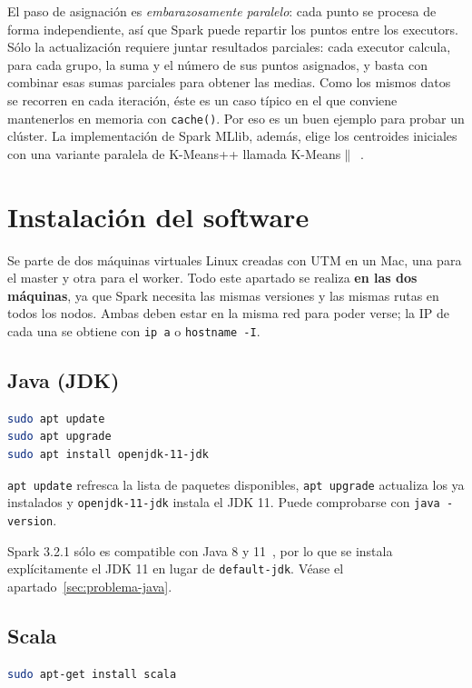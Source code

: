 \documentclass[11pt,a4paper]{article}
\begin{document}
El paso de asignación es \emph{embarazosamente paralelo}: cada punto se procesa de forma independiente, así que Spark puede repartir los puntos entre los executors. Sólo la actualización requiere juntar resultados parciales: cada executor calcula, para cada grupo, la suma y el número de sus puntos asignados, y basta con combinar esas sumas parciales para obtener las medias. Como los mismos datos se recorren en cada iteración, éste es un caso típico en el que conviene mantenerlos en memoria con \texttt{cache()}. Por eso es un buen ejemplo para probar un clúster. La implementación de Spark MLlib, además, elige los centroides iniciales con una variante paralela de K-Means++ llamada K-Means$\|$~\cite{spark-mllib-clustering}.

\section{Instalación del software}

Se parte de dos máquinas virtuales Linux creadas con UTM en un Mac, una para el master y otra para el worker. Todo este apartado se realiza \textbf{en las dos máquinas}, ya que Spark necesita las mismas versiones y las mismas rutas en todos los nodos. Ambas deben estar en la misma red para poder verse; la IP de cada una se obtiene con \texttt{ip a} o \texttt{hostname -I}.

\subsection{Java (JDK)}
\begin{lstlisting}[language=bash]
sudo apt update
sudo apt upgrade
sudo apt install openjdk-11-jdk
\end{lstlisting}
\texttt{apt update} refresca la lista de paquetes disponibles, \texttt{apt upgrade} actualiza los ya instalados y \texttt{openjdk-11-jdk} instala el JDK 11. Puede comprobarse con \texttt{java -version}.

\begin{aviso}
Spark 3.2.1 sólo es compatible con Java 8 y 11~\cite{spark-overview}, por lo que se instala explícitamente el JDK 11 en lugar de \texttt{default-jdk}. Véase el apartado~\ref{sec:problema-java}.
\end{aviso}

\subsection{Scala}
\begin{lstlisting}[language=bash]
sudo apt-get install scala
\end{lstlisting}
\end{document}
